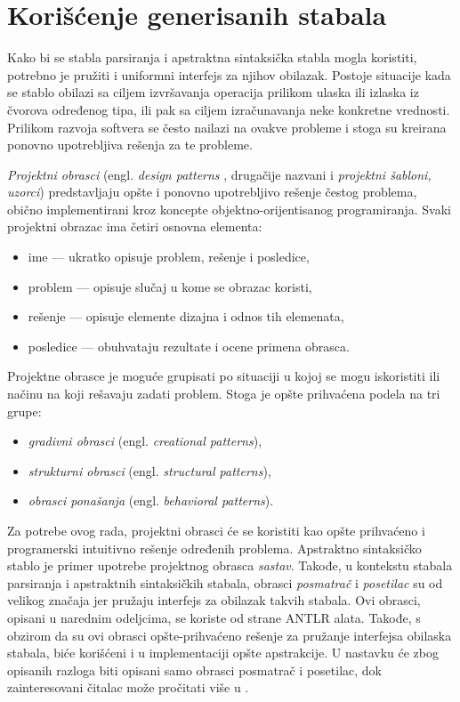 \section{Korišćenje generisanih stabala}
\label{sec:DesignPatterns}

Kako bi se stabla parsiranja i apstraktna sintaksička stabla mogla koristiti, potrebno je pružiti i uniformni interfejs za njihov obilazak. Postoje situacije kada se stablo obilazi sa ciljem izvršavanja operacija prilikom ulaska ili izlaska iz čvorova određenog tipa, ili pak sa ciljem izračunavanja neke konkretne vrednosti. Prilikom razvoja softvera se često nailazi na ovakve probleme i stoga su kreirana ponovno upotrebljiva rešenja za te probleme. 

\emph{Projektni obrasci} (engl. \emph{design patterns} \cite{DesignPatternsBook}, drugačije nazvani i \emph{projektni šabloni, uzorci}) predstavljaju opšte i ponovno upotrebljivo rešenje čestog problema, obično implementirani kroz koncepte objektno-orijentisanog programiranja. Svaki projektni obrazac ima četiri osnovna elementa:
\begin{itemize}
    \item ime --- ukratko opisuje problem, rešenje i posledice,
    \item problem --- opisuje slučaj u kome se obrazac koristi,
    \item rešenje --- opisuje elemente dizajna i odnos tih elemenata,
    \item posledice --- obuhvataju rezultate i ocene primena obrasca.
\end{itemize}

Projektne obrasce je moguće grupisati po situaciji u kojoj se mogu iskoristiti ili načinu na koji rešavaju zadati problem. Stoga je opšte prihvaćena podela na tri grupe:
\begin{itemize}
    \item \emph{gradivni obrasci} (engl. \emph{creational patterns}),
    \item \emph{strukturni obrasci} (engl. \emph{structural patterns}),
    \item \emph{obrasci ponašanja} (engl. \emph{behavioral patterns}).
\end{itemize}

Za potrebe ovog rada, projektni obrasci će se koristiti kao opšte prihvaćeno i programerski intuitivno rešenje određenih problema. Apstraktno sintaksičko stablo je primer upotrebe projektnog obrasca \emph{sastav}. Takođe, u kontekstu stabala parsiranja i apstraktnih sintaksičkih stabala, obrasci \emph{posmatrač} i \emph{posetilac} su od velikog značaja jer pružaju interfejs za obilazak takvih stabala. Ovi obrasci, opisani u narednim odeljcima, se koriste od strane ANTLR alata. Takođe, s obzirom da su ovi obrasci opšte-prihvaćeno rešenje za pružanje interfejsa obilaska stabala, biće korišćeni i u implementaciji opšte apstrakcije. U nastavku će zbog opisanih razloga biti opisani samo obrasci posmatrač i posetilac, dok zainteresovani čitalac može pročitati više u \cite{DesignPatternsBook}.

